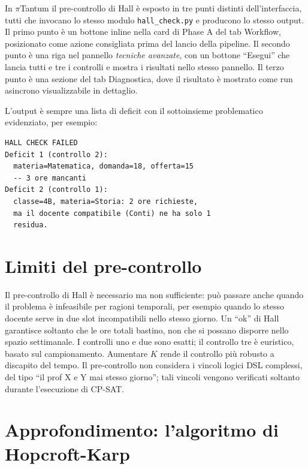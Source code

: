 In $\pi$Tantum il pre-controllo di Hall \`e esposto in tre
punti distinti dell'interfaccia, tutti che invocano lo
stesso modulo \texttt{hall\_check.py} e producono lo stesso
output. Il primo punto \`e un bottone inline nella card di
Phase A del tab Workflow, posizionato come azione consigliata
prima del lancio della pipeline. Il secondo punto \`e una
riga nel pannello \emph{tecniche avanzate}, con un bottone
``Esegui'' che lancia tutti e tre i controlli e mostra i
risultati nello stesso pannello. Il terzo punto \`e una
sezione del tab Diagnostica, dove il risultato \`e mostrato
come run asincrono visualizzabile in dettaglio.

L'output \`e sempre una lista di deficit con il sottoinsieme
problematico evidenziato, per esempio:

\begin{lstlisting}
HALL CHECK FAILED
Deficit 1 (controllo 2):
  materia=Matematica, domanda=18, offerta=15
  -- 3 ore mancanti
Deficit 2 (controllo 1):
  classe=4B, materia=Storia: 2 ore richieste,
  ma il docente compatibile (Conti) ne ha solo 1
  residua.
\end{lstlisting}

\section{Limiti del pre-controllo}

\begin{avvertenzabox}
Il pre-controllo di Hall \`e necessario ma non sufficiente:
pu\`o passare anche quando il problema \`e infeasibile per
ragioni temporali, per esempio quando lo stesso docente
serve in due slot incompatibili nello stesso giorno. Un
``ok'' di Hall garantisce soltanto che le ore totali
bastino, non che si possano disporre nello spazio
settimanale. I controlli uno e due sono esatti; il controllo
tre \`e euristico, basato sul campionamento. Aumentare $K$
rende il controllo pi\`u robusto a discapito del tempo. Il
pre-controllo non considera i vincoli logici DSL complessi,
del tipo ``il prof X e Y mai stesso giorno''; tali vincoli
vengono verificati soltanto durante l'esecuzione di CP-SAT.
\end{avvertenzabox}

\section{Approfondimento: l'algoritmo di Hopcroft-Karp}

